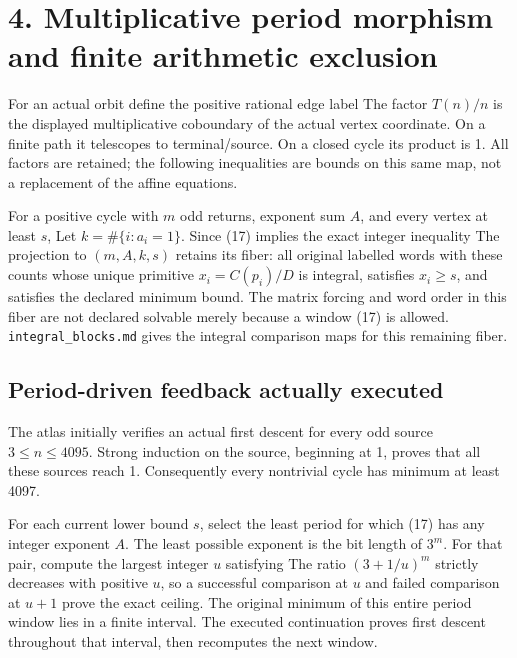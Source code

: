 \section{4. Multiplicative period morphism and finite arithmetic
exclusion}

For an actual orbit define the positive rational edge label
 The factor
\(T(n)/n\) is the displayed multiplicative coboundary of the actual
vertex coordinate. On a finite path it telescopes to terminal/source. On
a closed cycle its product is 1. All factors are retained; the following
inequalities are bounds on this same map, not a replacement of the
affine equations.

For a positive cycle with \(m\) odd returns, exponent sum \(A\), and
every vertex at least \(s\),
 Let \(k=\#\{i:a_i=1\}\). Since
 (17) implies
the exact integer inequality  The
projection to \((m,A,k,s)\) retains its fiber: all original labelled
words with these counts whose unique primitive \(x_i=C(p_i)/D\) is
integral, satisfies \(x_i\ge s\), and satisfies the declared minimum
bound. The matrix forcing and word order in this fiber are not declared
solvable merely because a window (17) is allowed.
\nolinkurl{integral_blocks.md} gives the integral comparison maps for
this remaining fiber.

\subsection{Period-driven feedback actually executed}

The atlas initially verifies an actual first descent for every odd
source \(3\le n\le4095\). Strong induction on the source, beginning at
1, proves that all these sources reach 1. Consequently every nontrivial
cycle has minimum at least 4097.

For each current lower bound \(s\), select the least period for which
(17) has any integer exponent \(A\). The least possible exponent is the
bit length of \(3^m\). For that pair, compute the largest integer \(u\)
satisfying  The ratio \((3+1/u)^m\)
strictly decreases with positive \(u\), so a successful comparison at
\(u\) and failed comparison at \(u+1\) prove the exact ceiling. The
original minimum of this entire period window lies in a finite interval.
The executed continuation proves first descent throughout that interval,
then recomputes the next window.

